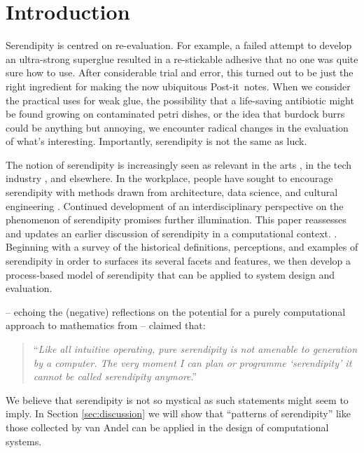 \section{Introduction}

Serendipity is centred on re-evaluation.  For example, a failed
attempt to develop an ultra-strong superglue resulted in a
re-stickable adhesive that no one was quite sure how to use.  After
considerable trial and error, this turned out to be just the right
ingredient for making the now ubiquitous Post-it\texttrademark\ notes.
%
%
When we consider the practical uses for weak glue, the possibility
that a life-saving antibiotic might be found growing on contaminated
petri dishes, or the idea that burdock burrs could be anything but
annoying, we encounter radical changes in the evaluation of what's
interesting.  Importantly, serendipity is not the same as luck. 

The notion of serendipity is increasingly seen as relevant in the arts
\cite{mckay-serendipity}, in the tech industry \cite{rao2015breaking},
and elsewhere.  In the workplace, people have sought to encourage
serendipity with methods drawn from architecture, data science, and
cultural engineering
\cite{kakko2009homo,engineering-serendipity,who-moved-cube}.
Continued development of an interdisciplinary perspective on the
phenomenon of serendipity promises further illumination.  This paper
reassesses and updates an earlier discussion of serendipity in a
computational context.  \cite{pease2013discussion}.  Beginning with a
survey of the historical definitions, perceptions, and examples of
serendipity in order to surfaces its several facets and features, we
then develop a process-based model of serendipity that can
be applied to system design and evaluation.

 -- echoing the
(negative) reflections on the potential
for a purely computational approach to mathematics from  -- claimed that:
\begin{quote}
``\emph{Like all intuitive operating, pure serendipity is not amenable
    to generation by a computer.  The very moment I can plan or
    programme `serendipity' it cannot be called serendipity
    anymore}.'' \citep{van1994anatomy}
\end{quote}
We believe that serendipity is not so mystical as such statements
might seem to imply.  In Section \ref{sec:discussion} we will
show that ``patterns of serendipity'' like those collected by van Andel
can be applied in the design of computational systems.

